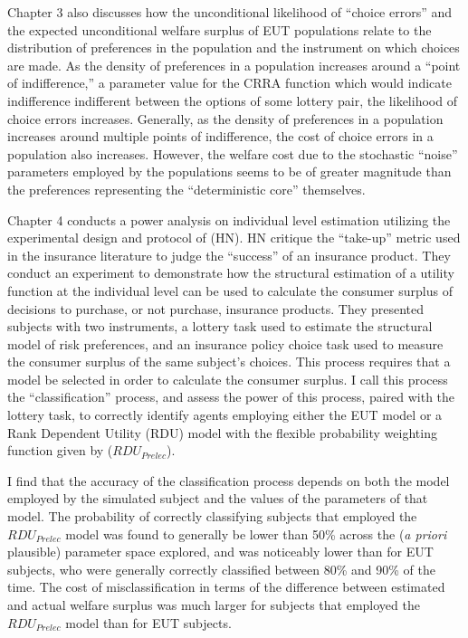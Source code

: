 \documentclass[../main.tex]{subfiles}
\begin{document}
Chapter 3 also discusses how the unconditional likelihood of \enquote{choice errors} and the expected unconditional welfare surplus of EUT populations relate to the distribution of preferences in the population and the instrument on which choices are made.
As the density of preferences in a population increases around a \enquote{point of indifference,} a parameter value for the CRRA function which would indicate indifference indifferent between the options of some lottery pair, the likelihood of choice errors increases.
Generally, as the density of preferences in a population increases around multiple points of indifference, the cost of choice errors in a population also increases.
However, the welfare cost due to the stochastic \enquote{noise} parameters employed by the populations seems to be of greater magnitude than the preferences representing the \enquote{deterministic core} themselves.



Chapter 4 conducts a power analysis on individual level estimation utilizing the experimental design and protocol of \textcite{Harrison2016} (HN).
HN critique the \enquote{take-up} metric used in the insurance literature to judge the \enquote{success} of an insurance product.
They conduct an experiment to demonstrate how the structural estimation of a utility function at the individual level can be used to calculate the consumer surplus of decisions to purchase, or not purchase, insurance products.
They presented subjects with two instruments, a lottery task used to estimate the structural model of risk preferences, and an insurance policy choice task used to measure the consumer surplus of the same subject's choices.
This process requires that a model be selected in order to calculate the consumer surplus.
I call this process the \enquote{classification} process, and assess the power of this process, paired with the lottery task, to correctly identify agents employing either the EUT model or a Rank Dependent Utility (RDU) model with the flexible probability weighting function given by \textcite{Prelec1998} ($\mathit{RDU_{Prelec}}$).

I find that the accuracy of the classification process depends on both the model employed by the simulated subject and the values of the parameters of that model.
The probability of correctly classifying subjects that employed the $\mathit{RDU_{Prelec}}$ model was found to generally be lower than 50\% across the (\textit{a priori} plausible) parameter space explored, and was noticeably lower than for EUT subjects, who were generally correctly classified between 80\% and 90\% of the time.
The cost of misclassification in terms of the difference between estimated and actual welfare surplus was much larger for subjects that employed the $\mathit{RDU_{Prelec}}$ model than for EUT subjects.
\end{document}
